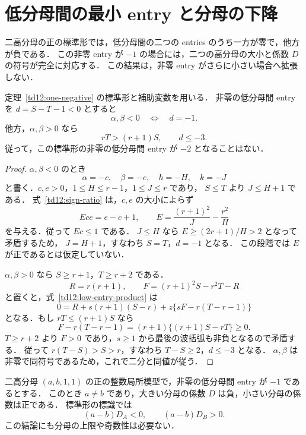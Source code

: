 
\section{低分母間の最小 entry と分母の下降}
\label{ml12:section}

二高分母の正の標準形では，低分母間の二つの entries のうち一方が零で，他方が負である．
この非零 entry が $-1$ の場合には，二つの高分母の大小と係数 $D$ の符号が完全に対応する．
この結果は，非零 entry がさらに小さい場合へ拡張しない．

\begin{lemma}
\label{ml12:dichotomy}
定理~\ref{td12:one-negative} の標準形と補助変数を用いる．
非零の低分母間 entry を $d=S-T-1<0$ とすると
\[
 \alpha,\beta<0\quad\Longleftrightarrow\quad d=-1.
\]
他方，$\alpha,\beta>0$ なら
\[
 rT>(r+1)S,\qquad d\leq-3.
\]
従って，この標準形の非零の低分母間 entry が $-2$ となることはない．
\end{lemma}

\begin{proof}
$\alpha,\beta<0$ のとき
\[
 \alpha=-c,\quad\beta=-e,\quad h=-H,\quad k=-J
\]
と書く．$c,e>0$，$1\leq H\leq r-1$，$1\leq J\leq r$ であり，
$S\leq T$ より $J\leq H+1$ である．
式~\eqref{td12:sign-ratio} は，$c,e$ の大小によらず
\[
 Ece=e-c+1,\qquad E=\frac{(r+1)^2}{J}-\frac{r^2}{H}
\]
を与える．従って $Ec\leq1$ である．
$J\leq H$ なら $E\geq(2r+1)/H>2$ となって矛盾するため，
$J=H+1$，すなわち $S=T$，$d=-1$ となる．
この段階では $E$ が正であるとは仮定していない．

$\alpha,\beta>0$ なら $S\geq r+1$，$T\geq r+2$ である．
\[
 R=r(r+1),\qquad F=(r+1)^2S-r^2T-R
\]
と置くと，式~\eqref{td12:low-entry-product} は
\[
 0=R+s(r+1)(S-r)+z\{sF-r(T-r-1)\}
\]
となる．もし $rT\leq(r+1)S$ なら
\[
 F-r(T-r-1)=(r+1)\{(r+1)S-rT\}\geq0.
\]
$T\geq r+2$ より $F>0$ であり，$s\geq1$ から最後の波括弧も非負となるので矛盾する．
従って $r(T-S)>S>r$，すなわち $T-S\geq2$，$d\leq-3$ となる．
$\alpha,\beta$ は非零で同符号であるため，これで二分と同値が従う．
\end{proof}

\begin{theorem}
\label{ml12:denominator-descent}
二高分母 $(a,b,1,1)$ の正の整数局所模型で，非零の低分母間 entry が $-1$ であるとする．
このとき $a\ne b$ であり，大きい分母の係数 $D$ は負，小さい分母の係数は正である．
標準形の標識では
\[
 (a-b)D_A<0,\qquad (a-b)D_B>0.
\]
この結論にも分母の上限や奇数性は必要ない．
\end{theorem}

